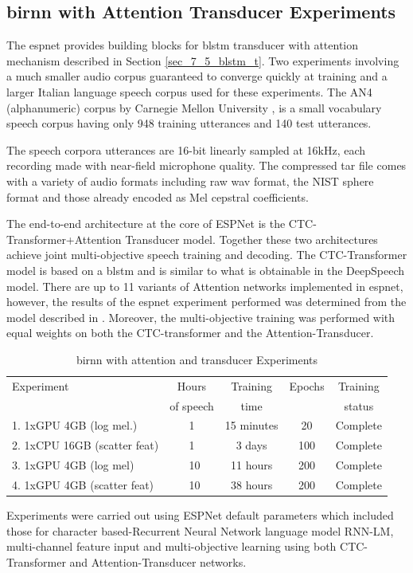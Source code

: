 \subsection{\acrshort{birnn} with Attention Transducer Experiments}
The \acrfull{espnet} \citep{watanabe2018espnet} provides building blocks for \acrshort{blstm} transducer with attention mechanism  described in Section \ref{sec_7_5_blstm_t}.  Two experiments involving a much smaller audio corpus guaranteed to converge quickly at training and a larger Italian language speech corpus \citep{foxvorge2019} used for these experiments.  The AN4 (alphanumeric) corpus by Carnegie Mellon University \citep{acero1990acoustical}, is a small vocabulary speech corpus having only 948 training utterances and 140 test utterances.

The speech corpora utterances are 16-bit linearly sampled at 16kHz, each recording made with near-field microphone quality.  The compressed tar file comes with a variety of audio formats including raw wav format, the NIST sphere format and those already encoded as Mel cepstral coefficients.

The end-to-end architecture at the core of ESPNet is the CTC-Transformer+Attention Transducer model.  Together these two architectures achieve joint multi-objective speech training and decoding.  The CTC-Transformer model is based on a \acrshort{blstm} and is similar to what is obtainable in the DeepSpeech model.  There are up to 11 variants of Attention networks implemented in \acrshort{espnet}, however, the results of the \acrshort{espnet} experiment performed was determined from the model described in \cite{chorowski2015attention}.  Moreover, the multi-objective training was performed with equal weights on both the CTC-transformer and the Attention-Transducer.  

\begin{table}
  \caption{\acrshort{birnn} with attention and transducer Experiments}
  \label{tab_c6_03_training}
\begin{tabular}{lcccc}
\toprule
Experiment & Hours & Training  & Epochs & Training \\
& of speech & time & & status \\
\midrule
1. 1xGPU 4GB (log mel.) & 1 & 15 minutes & 20 & Complete\\
2. 1xCPU 16GB (scatter feat) & 1 & 3 days & 100 & Complete\\
3. 1xGPU 4GB (log mel) & ~10 & 11 hours & 200 & Complete\\
4. 1xGPU 4GB (scatter feat) & ~10 & 38 hours & 200 & Complete\\
\bottomrule
\end{tabular}
\end{table}
Experiments were carried out using ESPNet default parameters which included those for character based-Recurrent Neural Network language model RNN-LM, multi-channel feature input and multi-objective learning using both CTC-Transformer and Attention-Transducer networks.

